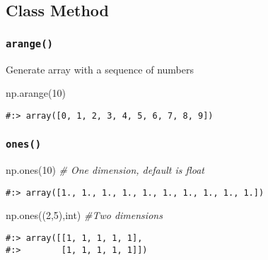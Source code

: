 \documentclass[
]{book}
\newenvironment{Shaded}{\begin{snugshade}}{\end{snugshade}}
\newcommand{\CommentTok}[1]{\textcolor[rgb]{0.37,0.37,0.37}{\textit{#1}}}
\newcommand{\DecValTok}[1]{\textcolor[rgb]{0.06,0.06,0.06}{#1}}
\newcommand{\NormalTok}[1]{#1}
\newcommand{\StringTok}[1]{\textcolor[rgb]{0.5,0.5,0.5}{#1}}
\begin{document}
\hypertarget{class-method-3}{%
\subsection{Class Method}\label{class-method-3}}

\hypertarget{arange}{%
\subsubsection{\texorpdfstring{\texttt{arange()}}{arange()}}\label{arange}}

Generate array with a sequence of numbers

\begin{Shaded}
\begin{Highlighting}[]
\NormalTok{np.arange(}\DecValTok{10}\NormalTok{)}
\end{Highlighting}
\end{Shaded}

\begin{verbatim}
#:> array([0, 1, 2, 3, 4, 5, 6, 7, 8, 9])
\end{verbatim}

\hypertarget{ones}{%
\subsubsection{\texorpdfstring{\texttt{ones()}}{ones()}}\label{ones}}

\begin{Shaded}
\begin{Highlighting}[]
\NormalTok{np.ones(}\DecValTok{10}\NormalTok{)  }\CommentTok{\# One dimension, default is float}
\end{Highlighting}
\end{Shaded}

\begin{verbatim}
#:> array([1., 1., 1., 1., 1., 1., 1., 1., 1., 1.])
\end{verbatim}

\begin{Shaded}
\begin{Highlighting}[]
\NormalTok{np.ones((}\DecValTok{2}\NormalTok{,}\DecValTok{5}\NormalTok{),}\StringTok{\textquotesingle{}int\textquotesingle{}}\NormalTok{)  }\CommentTok{\#Two dimensions}
\end{Highlighting}
\end{Shaded}

\begin{verbatim}
#:> array([[1, 1, 1, 1, 1],
#:>        [1, 1, 1, 1, 1]])
\end{verbatim}
\end{document}
